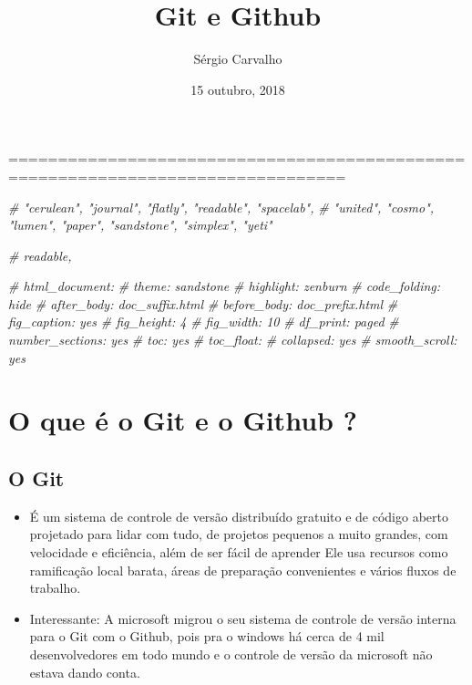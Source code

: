 \documentclass[]{tufte-handout}
\title{Git e Github}
\author{Sérgio Carvalho}
\date{15 outubro, 2018}
\newenvironment{Shaded}{}{}
\newcommand{\CommentTok}[1]{\textcolor[rgb]{0.38,0.63,0.69}{\textit{#1}}}
\begin{document}
\maketitle




================================================================================

\begin{Shaded}
\begin{Highlighting}[]
\CommentTok{# "cerulean", "journal", "flatly", "readable", "spacelab", }
\CommentTok{# "united", "cosmo", "lumen", "paper", "sandstone", "simplex", "yeti"}

\CommentTok{# readable,}

    \CommentTok{# html_document:}
    \CommentTok{# theme: sandstone}
    \CommentTok{# highlight: zenburn }
    \CommentTok{# code_folding: hide}
    \CommentTok{# after_body: doc_suffix.html}
    \CommentTok{# before_body: doc_prefix.html}
    \CommentTok{# fig_caption: yes}
    \CommentTok{# fig_height: 4}
    \CommentTok{# fig_width: 10}
    \CommentTok{# df_print: paged}
    \CommentTok{# number_sections: yes}
    \CommentTok{# toc: yes}
    \CommentTok{# toc_float:}
    \CommentTok{#   collapsed: yes}
    \CommentTok{#   smooth_scroll: yes}
\end{Highlighting}
\end{Shaded}

\section{O que é o Git e o Github ?}\label{o-que-e-o-git-e-o-github}

\subsection{O Git}\label{o-git}

\begin{itemize}
\item
  É um sistema de controle de versão distribuído gratuito e de código
  aberto projetado para lidar com tudo, de projetos pequenos a muito
  grandes, com velocidade e eficiência, além de ser fácil de aprender
  Ele usa recursos como ramificação local barata, áreas de preparação
  convenientes e vários fluxos de trabalho.
\item
  Interessante: A microsoft migrou o seu sistema de controle de versão
  interna para o Git com o Github, pois pra o windows há cerca de 4 mil
  desenvolvedores em todo mundo e o controle de versão da microsoft não
  estava dando conta.
\end{itemize}
\end{document}
